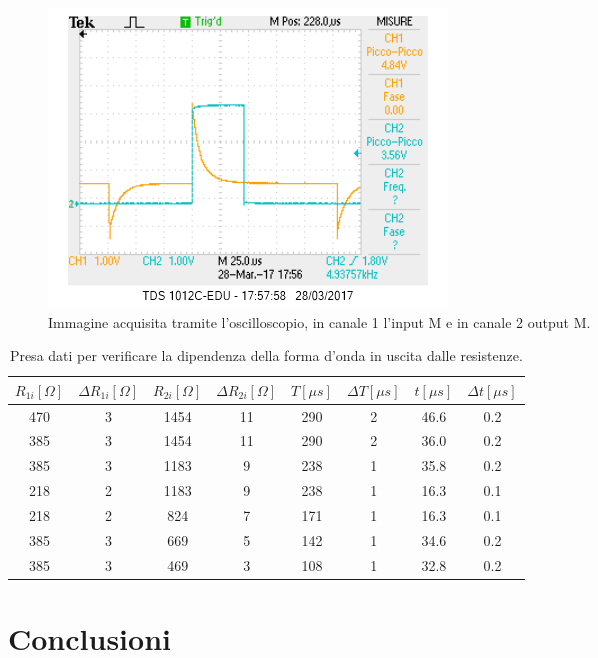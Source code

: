 \documentclass[10pt,a4paper]{article}
\begin{document}
\begin{figure}[!htb]
  \centering
  \includegraphics[scale=0.75]{generatore1inm2outm.png}
\caption{Immagine acquisita tramite l'oscilloscopio, in canale 1 l'input M e in canale 2 output M.\label{osc:generatorequadra}}
\end{figure}


\begin{table}[!htb]
\centering
\begin{tabular}{|c|c|c|c|c|c|c|c|}
\hline 
$R_{1i} [\Omega]$ & $\Delta R_{1i} [\Omega]$ & $R_{2i} [\Omega]$  & $\Delta R_{2i} [\Omega]$ & $T [\mu s]$ & $\Delta T [\mu s]$&$t [\mu s ]$ & $\Delta t [\mu s]$\\
\hline
 470 & 3 & 1454	& 11 & 290 & 2& 46.6& 0.2\\ 
\hline
385 & 3 & 1454	& 11 & 290 & 2& 36.0& 0.2\\ 
\hline 
 385 & 3 & 1183	& 9 & 238 & 1& 35.8& 0.2\\
\hline
218 & 2 & 1183	& 9 & 238 & 1& 16.3& 0.1\\ 
\hline
218 & 2 & 824	& 7 & 171 & 1& 16.3& 0.1\\ 
\hline
385 & 3 & 669	& 5 & 142 & 1& 34.6& 0.2\\ 
\hline
 385 & 3 & 469	& 3 & 108 & 1& 32.8& 0.2\\ 
 \hline
\end{tabular} 
\caption{Presa dati per verificare la dipendenza della forma d'onda in uscita dalle resistenze.\label{tab:generatore}}
\end{table}

\section{Conclusioni}
\end{document}

